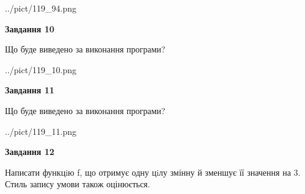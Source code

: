 \documentclass[12pt, ukrainian]{article}
\begin{document}
{\begin {large}
\begin{center}
	{../pict/119_94.png}
\end{center}
\newpage

{\begin {center}\textbf{Завдання 10}\end {center}}

Що буде виведено за виконання програми?\par
\begin{center}
	{../pict/119_10.png}
\end{center}
\newpage

{\begin {center}\textbf{Завдання 11}\end {center}}

Що буде виведено за виконання програми?\par
\begin{center}
	{../pict/119_11.png}
\end{center}
\newpage

{\begin {center}\textbf{Завдання 12}\end {center}}


Написати функцiю f, що отримує одну цiлу змінну й зменшує її значення на 3. Стиль запису умови також оцінюється.\par
\newpage

\end {large}}
\end{document}
